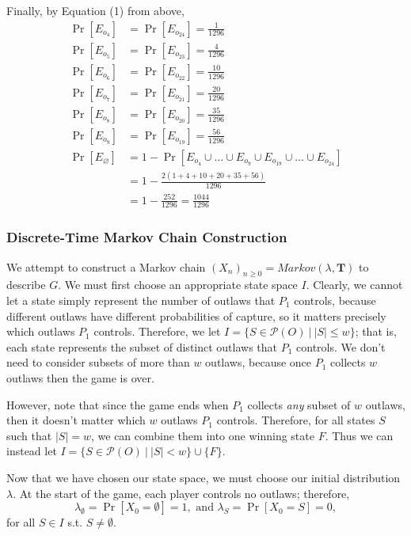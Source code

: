 \documentclass{article}
\newcommand{\T}{\textbf{{T}}}
\theoremstyle{definition}
\theoremstyle{plain}
\begin{document}
	Finally, by Equation (1) from above,
	\begin{align*}
	\Pr[E_{o_4}] &= \Pr[E_{o_{24}}] = \tfrac{1}{1296}\\
	\Pr[E_{o_5}] &= \Pr[E_{o_{23}}] = \tfrac{4}{1296}\\
	\Pr[E_{o_6}] &= \Pr[E_{o_{22}}] = \tfrac{10}{1296}\\
	\Pr[E_{o_7}] &= \Pr[E_{o_{21}}] = \tfrac{20}{1296}\\
	\Pr[E_{o_8}] &= \Pr[E_{o_{20}}] = \tfrac{35}{1296}\\
	\Pr[E_{o_9}] &= \Pr[E_{o_{19}}] = \tfrac{56}{1296}\\
	\Pr[E_\varnothing] &= 1 - \Pr[E_{o_4} \cup \dots \cup E_{o_9} \cup E_{o_{19}} \cup \dots \cup E_{o_{24}}]\\
		&= 1 - \frac{2(1 + 4 + 10 + 20 + 35 + 56)}{1296}\\
		&= 1 - \frac{252}{1296} = \frac{1044}{1296}
	\end{align*}

	\subsubsection{Discrete-Time Markov Chain Construction}
We attempt to construct a Markov chain $(X_n)_{n \geq 0} = Markov(\lambda, \T)$ to describe $G$. We must first choose an appropriate state space $I$. Clearly, we cannot let a state simply represent the number of outlaws that $P_1$ controls, because different outlaws have different probabilities of capture, so it matters precisely which outlaws $P_1$ controls.  Therefore, we let $I = \{S \in \mathcal{P}(O) ~\big|~ |S| \leq w\}$; that is, each state represents the subset of distinct outlaws that $P_1$ controls. We don't need to consider subsets of more than $w$ outlaws, because once $P_1$ collects $w$ outlaws then the game is over.

	However, note that since the game ends when $P_1$ collects \textit{any} subset of $w$ outlaws, then it doesn't matter which $w$ outlaws $P_1$ controls. Therefore, for all states $S$ such that $|S| = w$, we can combine them into one winning state $F$. Thus we can instead let $I = \{S \in \mathcal{P}(O) ~\big|~ |S| < w\} \cup \{F\}$.

	Now that we have chosen our state space, we must choose our initial distribution $\lambda$. At the start of the game, each player controls no outlaws; therefore, \[\lambda_\emptyset = \Pr[X_0 = \emptyset] = 1, \text{ and }\lambda_S = \Pr[X_0 = S] = 0,\] for all $S \in I$ s.t. $S \neq \emptyset$.
\end{document}
